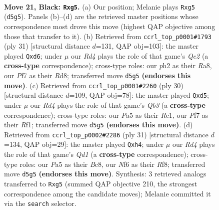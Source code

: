 \documentclass[11pt]{article}
\begin{document}
\clearpage

\begin{figure}[p]\centering
\begin{subfigure}{0.46\textwidth}\centering
\resizebox{\linewidth}{!}{%
\newchessgame
\chessboard[
  setfen={2b5/1p2qpkp/r4np1/p2r2Q1/Pn6/NPB2NP1/5PBP/R3R1K1 b - - 4 21},
  showmover=false,
  pgfstyle=straightmove, color=movearrow, markmove={d5-g5}
]}
\caption{}
\end{subfigure}\hfill
\begin{subfigure}{0.46\textwidth}\centering
\resizebox{\linewidth}{!}{%
\newchessgame
\chessboard[
  setfen={r2r2k1/pb1nqppp/3Qpn2/1B6/1P6/4PN2/1B3PPP/R2R2K1 b - - 2 16},
  showmover=false,
  pgfstyle=straightmove, color=movearrow, markmove={e7-d6}
]}
\caption{}
\end{subfigure}
\\[4pt]
\begin{subfigure}{0.46\textwidth}\centering
\resizebox{\linewidth}{!}{%
\newchessgame
\chessboard[
  setfen={2r2rk1/1p2ppbp/2n2np1/pN1q4/P7/1Q3NP1/1B1PPPKP/2R2R2 w - - 1 16},
  showmover=false,
  pgfstyle=straightmove, color=movearrow, markmove={b3-d5}
]}
\caption{}
\end{subfigure}\hfill
\begin{subfigure}{0.46\textwidth}\centering
\resizebox{\linewidth}{!}{%
\newchessgame
\chessboard[
  setfen={r1bq1rk1/1p1n1pp1/4p2p/p1n5/7Q/2N1PN1P/PP2BPP1/R2R2K1 b - - 0 16},
  showmover=false,
  pgfstyle=straightmove, color=movearrow, markmove={d8-h4}
]}
\caption{}
\end{subfigure}
\caption{\textbf{Move 21, Black: \texttt{Rxg5}.} (a) Our position; Melanie plays \texttt{Rxg5} (\texttt{d5g5}). Panels (b)--(d) are the retrieved master positions whose correspondence most drove this move (highest QAP objective among those that transfer to it). (b) Retrieved from \texttt{ccrl\_top\_p0001\#1793} (ply 31) [structural distance $d$=131, QAP obj=103]: the master played \texttt{Qxd6}; under $\mu$ our \emph{Rd4} plays the role of that game's \emph{Qe2} (a \textbf{cross-type} correspondence); cross-type roles: our \emph{p}h2 as their \emph{R}a8, our \emph{P}f7 as their \emph{R}d8; transferred move \texttt{d5g5} \textbf{(endorses this move)}. (c) Retrieved from \texttt{ccrl\_top\_p0001\#2260} (ply 30) [structural distance $d$=109, QAP obj=78]: the master played \texttt{Qxd5}; under $\mu$ our \emph{Rd4} plays the role of that game's \emph{Qb3} (a \textbf{cross-type} correspondence); cross-type roles: our \emph{P}a5 as their \emph{R}c1, our \emph{P}f7 as their \emph{R}f1; transferred move \texttt{d5g5} \textbf{(endorses this move)}. (d) Retrieved from \texttt{ccrl\_top\_p0002\#2286} (ply 31) [structural distance $d$=134, QAP obj=29]: the master played \texttt{Qxh4}; under $\mu$ our \emph{Rd4} plays the role of that game's \emph{Qd1} (a \textbf{cross-type} correspondence); cross-type roles: our \emph{P}a5 as their \emph{B}c8, our \emph{N}f6 as their \emph{R}f8; transferred move \texttt{d5g5} \textbf{(endorses this move)}. Synthesis: 3 retrieved analogs transferred to \texttt{Rxg5} (summed QAP objective 210, the strongest correspondence among the candidate moves); Melanie committed it via the \texttt{search} selector.}
\label{fig:thought-m41}
\end{figure}
\end{document}
